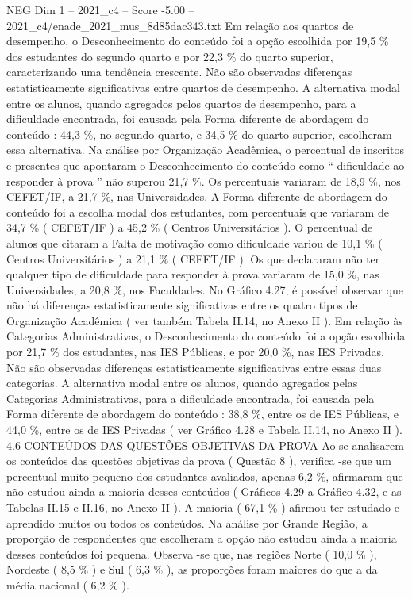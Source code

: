 \begin{textsample}{NEG Dim 1 – 2021\_c4 – Score -5.00 – 2021\_c4/enade\_2021\_mus\_8d85dac343.txt}
Em relação aos quartos de desempenho, o Desconhecimento do conteúdo foi a opção escolhida por 19,5 \% dos estudantes do segundo quarto e por 22,3 \% do quarto superior, caracterizando uma tendência crescente.
Não são observadas diferenças estatisticamente significativas entre quartos de desempenho.
A alternativa modal entre os alunos, quando agregados pelos quartos de desempenho, para a dificuldade encontrada, foi causada pela Forma diferente de abordagem do conteúdo : 44,3 \%, no segundo quarto, e 34,5 \% do quarto superior, escolheram essa alternativa.
Na análise por Organização Acadêmica, o percentual de inscritos e presentes que apontaram o Desconhecimento do conteúdo como “ dificuldade ao responder à prova ” não superou 21,7 \%.
Os percentuais variaram de 18,9 \%, nos CEFET/IF, a 21,7 \%, nas Universidades.
A Forma diferente de abordagem do conteúdo foi a escolha modal dos estudantes, com percentuais que variaram de 34,7 \% ( CEFET/IF ) a 45,2 \% ( Centros Universitários ).
O percentual de alunos que citaram a Falta de motivação como dificuldade variou de 10,1 \% ( Centros Universitários ) a 21,1 \% ( CEFET/IF ).
Os que declararam não ter qualquer tipo de dificuldade para responder à prova variaram de 15,0 \%, nas Universidades, a 20,8 \%, nos Faculdades.
No Gráfico 4.27, é possível observar que não há diferenças estatisticamente significativas entre os quatro tipos de Organização Acadêmica ( ver também Tabela II.14, no Anexo II ).
Em relação às Categorias Administrativas, o Desconhecimento do conteúdo foi a opção escolhida por 21,7 \% dos estudantes, nas IES Públicas, e por 20,0 \%, nas IES Privadas.
Não são observadas diferenças estatisticamente significativas entre essas duas categorias.
A alternativa modal entre os alunos, quando agregados pelas Categorias Administrativas, para a dificuldade encontrada, foi causada pela Forma diferente de abordagem do conteúdo : 38,8 \%, entre os de IES Públicas, e 44,0 \%, entre os de IES Privadas ( ver Gráfico 4.28 e Tabela II.14, no Anexo II ). 4.6 CONTEÚDOS DAS QUESTÕES OBJETIVAS DA PROVA Ao se analisarem os conteúdos das questões objetivas da prova ( Questão 8 ), verifica -se que um percentual muito pequeno dos estudantes avaliados, apenas 6,2 \%, afirmaram que não estudou ainda a maioria desses conteúdos ( Gráficos 4.29 a Gráfico 4.32, e as Tabelas II.15 e II.16, no Anexo II ).
A maioria ( 67,1 \% ) afirmou ter estudado e aprendido muitos ou todos os conteúdos.
Na análise por Grande Região, a proporção de respondentes que escolheram a opção não estudou ainda a maioria desses conteúdos foi pequena.
Observa -se que, nas regiões Norte ( 10,0 \% ), Nordeste ( 8,5 \% ) e Sul ( 6,3 \% ), as proporções foram maiores do que a da média nacional ( 6,2 \% ).

\end{textsample}
